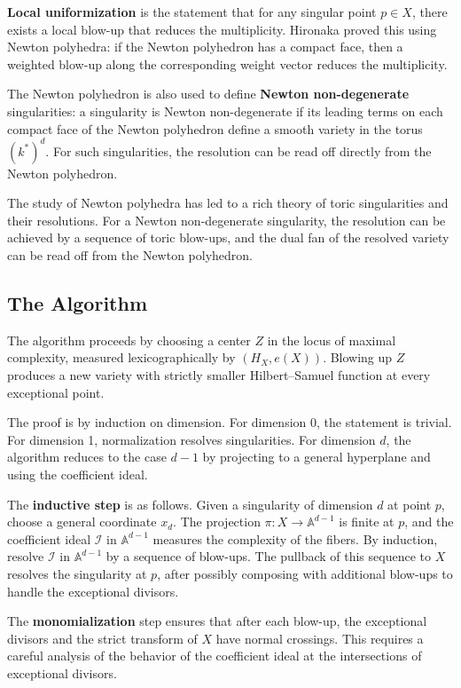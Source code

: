 \textbf{Local uniformization} is the statement that for any singular point $p \in X$, there exists a local blow-up that reduces the multiplicity. Hironaka proved this using Newton polyhedra: if the Newton polyhedron has a compact face, then a weighted blow-up along the corresponding weight vector reduces the multiplicity.

The Newton polyhedron is also used to define \textbf{Newton non-degenerate} singularities: a singularity is Newton non-degenerate if its leading terms on each compact face of the Newton polyhedron define a smooth variety in the torus $(k^*)^d$. For such singularities, the resolution can be read off directly from the Newton polyhedron.

The study of Newton polyhedra has led to a rich theory of toric singularities and their resolutions. For a Newton non-degenerate singularity, the resolution can be achieved by a sequence of toric blow-ups, and the dual fan of the resolved variety can be read off from the Newton polyhedron.

\subsection*{The Algorithm}

The algorithm proceeds by choosing a center $Z$ in the locus of maximal complexity, measured lexicographically by $(H_X, e(X))$. Blowing up $Z$ produces a new variety with strictly smaller Hilbert--Samuel function at every exceptional point.

The proof is by induction on dimension. For dimension 0, the statement is trivial. For dimension 1, normalization resolves singularities. For dimension $d$, the algorithm reduces to the case $d-1$ by projecting to a general hyperplane and using the coefficient ideal.

The \textbf{inductive step} is as follows. Given a singularity of dimension $d$ at point $p$, choose a general coordinate $x_d$. The projection $\pi: X \to \mathbb{A}^{d-1}$ is finite at $p$, and the coefficient ideal $\mathcal{I}$ in $\mathbb{A}^{d-1}$ measures the complexity of the fibers. By induction, resolve $\mathcal{I}$ in $\mathbb{A}^{d-1}$ by a sequence of blow-ups. The pullback of this sequence to $X$ resolves the singularity at $p$, after possibly composing with additional blow-ups to handle the exceptional divisors.

The \textbf{monomialization} step ensures that after each blow-up, the exceptional divisors and the strict transform of $X$ have normal crossings. This requires a careful analysis of the behavior of the coefficient ideal at the intersections of exceptional divisors.

